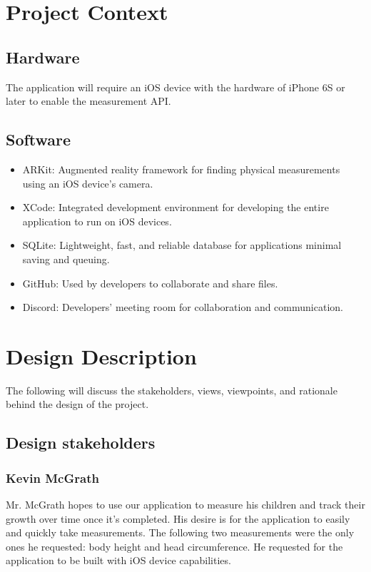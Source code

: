 \documentclass[onecolumn, draftclsnofoot,10pt, compsoc]{IEEEtran}
\begin{document}


\section{Project Context}
\subsection{Hardware}
The application will require an iOS device with the hardware of iPhone 6S or later to enable the measurement API.

\subsection{Software}
\begin{itemize}
  \item ARKit: Augmented reality framework for finding physical measurements using an iOS device's camera.
  \item XCode: Integrated development environment for developing the entire application to run on iOS devices.
  \item SQLite: Lightweight, fast, and reliable database for applications minimal saving and queuing.
  \item GitHub: Used by developers to collaborate and share files.
  \item Discord: Developers' meeting room for collaboration and communication.
\end{itemize}


\section{Design Description}
The following will discuss the stakeholders, views, viewpoints, and rationale behind the design of the project.
\subsection{Design stakeholders}

\subsubsection{Kevin McGrath}
Mr. McGrath hopes to use our application to measure his children and track their growth over time once it's completed. His desire is for the application to easily and quickly take measurements. The following two measurements were the only ones he requested: body height and head circumference. He requested for the application to be built with iOS device capabilities.
\end{document}
